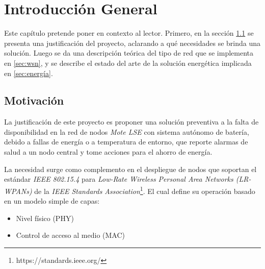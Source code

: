 
\chapter{Introducción General} %

\label{Chapter1} %
\label{IntroGeneral}


\newcommand{\keyword}[1]{\textbf{#1}}
\newcommand{\tabhead}[1]{\textbf{#1}}
\newcommand{\code}[1]{\texttt{#1}}
\newcommand{\file}[1]{\texttt{\bfseries#1}}
\newcommand{\option}[1]{\texttt{\itshape#1}}
\newcommand{\grados}{$^{\circ}$}


Este capítulo pretende poner en contexto al lector. Primero, en la sección \ref{sec:Motivación} se presenta una justificación del proyecto, aclarando a qué necesidades se brinda una solución. Luego se da una descripción teórica del tipo de red que se implementa en \ref{sec:wsn}, y se describe el estado del arte de la solución energética implicada en \ref{sec:energía}.

\section{Motivación}
\label{sec:Motivación}

La justificación de este proyecto es proponer una solución preventiva a la falta de disponibilidad en la red de nodos \textit{Mote LSE} \citep{mote} con sistema autónomo de batería, debido a fallas de energía o a temperatura de entorno, que reporte alarmas de salud a un nodo central y tome acciones para el ahorro de energía.

La necesidad surge como complemento en el despliegue de nodos que soportan el estándar \textit{IEEE 802.15.4} \citep{802154} para \textit{Low-Rate Wireless Personal Area Networks (LR-WPANs)} de la \textit{IEEE Standards Association}\footnote{https://standards.ieee.org/}. El cual define su operación basado en un modelo simple de capas:
		\begin{itemize}
			\item Nivel físico (PHY)
			\item Control de acceso al medio (MAC)
		\end{itemize}

